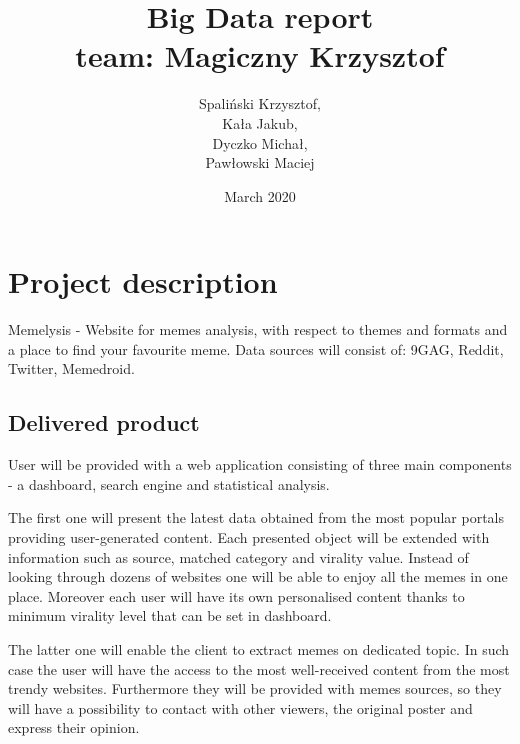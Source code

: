 \documentclass{article}
\title{\textbf{Big Data report} \\ \vspace{2em} team: Magiczny Krzysztof \\ \vspace{2em}}
\author{Spaliński Krzysztof, \\ Kała Jakub, \\ Dyczko Michał, \\ Pawłowski Maciej}
\date{\vfill March 2020}
\begin{document}
\clearpage\maketitle
\thispagestyle{empty}

\newpage

\section{Project description}



Memelysis - Website for memes analysis, with respect to themes and formats and a place to find your favourite meme. Data sources will consist of: 9GAG, Reddit, Twitter, Memedroid.


\subsection{Delivered product}

User will be provided with a web application consisting of three main \linebreak components - a dashboard, search engine and statistical analysis. 

The first one will present the latest data obtained from the most popular \linebreak portals providing user-generated content. Each presented object will be \linebreak extended with information such as source, matched category and virality value. Instead of looking through dozens of websites one will be able to enjoy all the memes in one place. Moreover each user will have its own personalised content thanks to minimum virality level that can be set in dashboard. %

The latter one will enable the client to extract memes on dedicated topic. \linebreak In such case the user will have the access to the most well-received content from the most trendy websites. Furthermore they will be provided with memes sources, so they will have a possibility to contact with other viewers, the original poster and express their opinion. 
\end{document}
